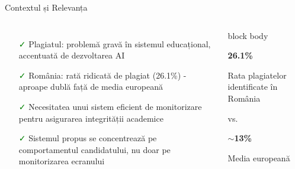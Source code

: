 \documentclass[aspectratio=169,9pt]{beamer}
\begin{document}
\begin{frame}{Contextul și Relevanța}
        \begin{columns}
                \begin{itemize}[leftmargin=0.5cm,itemsep=0.05cm]
                        \item[\textcolor{green}{\faCheck}] Plagiatul: problemă gravă în sistemul educațional, accentuată de dezvoltarea AI
                        \item[\textcolor{green}{\faCheck}] România: rată ridicată de plagiat (26.1\%) - aproape dublă față de media europeană
                        \item[\textcolor{green}{\faCheck}] Necesitatea unui sistem eficient de monitorizare pentru asigurarea integrității academice
                        \item[\textcolor{green}{\faCheck}] Sistemul propus se concentrează pe comportamentul candidatului, nu doar pe monitorizarea ecranului
                \end{itemize}

                \begin{beamercolorbox}[rounded=true,shadow=true,sep=1em]{block body}
                \centering
                {\Large\color{mainblue} \faChartBar}
                
                \vspace{0.3cm}
                {\Large\color{mainblue}\textbf{26.1\%}}
                
                \color{gray}Rata plagiatelor identificate în România
                
                \vspace{0.3cm}
                vs.
                
                \vspace{0.3cm}
                {\Large\color{green}\textbf{$\sim$13\%}}
                
                \color{gray}Media europeană
                \end{beamercolorbox}
        \end{columns}
\end{frame}
\end{document}
